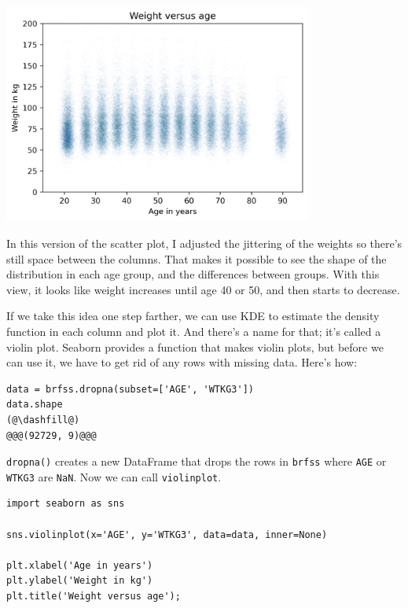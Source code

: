 \begin{center}
\includegraphics[width=4in]{chapters/09_relationships_files/09_relationships_39_0.png}
\end{center}

In this version of the scatter plot, I adjusted the jittering of the
weights so there's still space between the columns. That makes it
possible to see the shape of the distribution in each age group, and the
differences between groups. With this view, it looks like weight
increases until age 40 or 50, and then starts to decrease.

If we take this idea one step farther, we can use KDE to estimate the
density function in each column and plot it. And there's a name for
that; it's called a violin plot. Seaborn provides a function that makes
violin plots, but before we can use it, we have to get rid of any rows
with missing data. Here's how:

\begin{lstlisting}[]
data = brfss.dropna(subset=['AGE', 'WTKG3'])
data.shape
(@\dashfill@)
@@@(92729, 9)@@@
\end{lstlisting}

\passthrough{\lstinline!dropna()!} creates a new DataFrame that drops
the rows in \passthrough{\lstinline!brfss!} where
\passthrough{\lstinline!AGE!} or \passthrough{\lstinline!WTKG3!} are
\passthrough{\lstinline!NaN!}. Now we can call
\passthrough{\lstinline!violinplot!}.

\begin{lstlisting}[]
import seaborn as sns

sns.violinplot(x='AGE', y='WTKG3', data=data, inner=None)

plt.xlabel('Age in years')
plt.ylabel('Weight in kg')
plt.title('Weight versus age');
\end{lstlisting}

